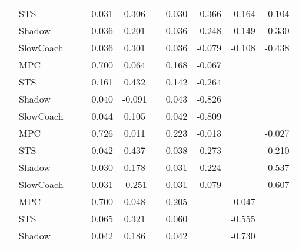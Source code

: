 \begin{tabular}{|l|l|*{9}{c|}}
                                                           & STS &       &        &     0.031 &  0.306 &     &  0.030 &  -0.366 &  -0.164 &   -0.104 \\
                                                           & Shadow &       &        &     0.036 &  0.201 &     &  0.036 &  -0.248 &  -0.149 &   -0.330 \\
                                                           & SlowCoach &       &        &     0.036 &  0.301 &     &  0.036 &  -0.079 &  -0.108 &   -0.438 \\
\midrule
[False, False, True, True, False, True, True, False, False] & MPC &       &        &     0.700 &  0.064 &     &  0.168 &  -0.067 &      &       \\
                                                           & STS &       &        &     0.161 &  0.432 &     &  0.142 &  -0.264 &      &       \\
                                                           & Shadow &       &        &     0.040 & -0.091 &     &  0.043 &  -0.826 &      &       \\
                                                           & SlowCoach &       &        &     0.044 &  0.105 &     &  0.042 &  -0.809 &      &       \\
\midrule
[False, False, True, True, False, True, True, False, True] & MPC &       &        &     0.726 &  0.011 &     &  0.223 &  -0.013 &      &   -0.027 \\
                                                           & STS &       &        &     0.042 &  0.437 &     &  0.038 &  -0.273 &      &   -0.210 \\
                                                           & Shadow &       &        &     0.030 &  0.178 &     &  0.031 &  -0.224 &      &   -0.537 \\
                                                           & SlowCoach &       &        &     0.031 & -0.251 &     &  0.031 &  -0.079 &      &   -0.607 \\
\midrule
[False, False, True, True, False, True, False, True, False] & MPC &       &        &     0.700 &  0.048 &     &  0.205 &      &  -0.047 &       \\
                                                           & STS &       &        &     0.065 &  0.321 &     &  0.060 &      &  -0.555 &       \\
                                                           & Shadow &       &        &     0.042 &  0.186 &     &  0.042 &      &  -0.730 &       \\

\end{tabular}

